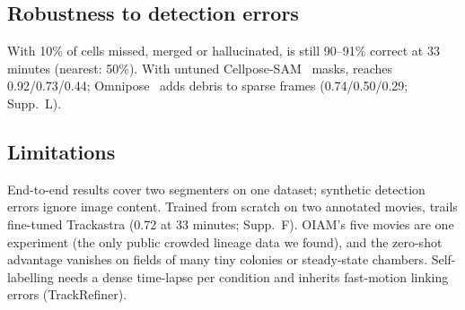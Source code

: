 \subsection{Robustness to detection errors}
With 10\% of cells missed, merged or hallucinated, \ours is still 90--91\% correct at 33 minutes (nearest: 50\%).
With untuned Cellpose-SAM~\cite{pachitariu2025cellposesam} masks, \ours reaches 0.92/0.73/0.44; Omnipose~\cite{cutler2022omnipose} adds debris to sparse frames (0.74/0.50/0.29; Supp.~L).

\subsection{Limitations}
End-to-end results cover two segmenters on one dataset; synthetic detection errors ignore image content.
Trained from scratch on two annotated movies, \ours trails fine-tuned Trackastra (0.72  at 33 minutes; Supp.~F). OIAM's five movies are one experiment (the only public crowded lineage data we found), and the zero-shot advantage vanishes on fields of many tiny colonies or steady-state chambers.
Self-labelling needs a dense time-lapse per condition and inherits fast-motion linking errors (TrackRefiner).
